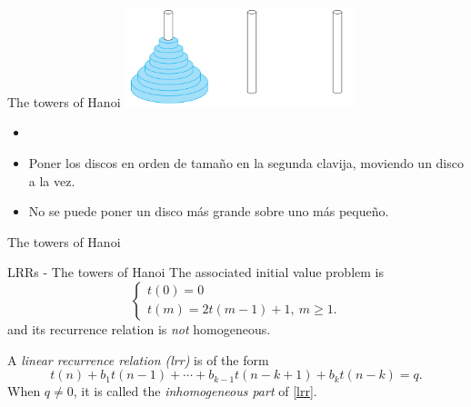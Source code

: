 \documentclass{beamer}
\begin{document}
\begin{frame}{The towers of Hanoi}
	\includegraphics[width=0.5\textwidth]{hanoi.png}

	\begin{itemize}
		\item[]
		\item Poner los discos en orden de tamaño en la segunda clavija,
			moviendo un disco a la vez.
		\item No se puede poner un disco más grande sobre uno más pequeño.
	\end{itemize}
\end{frame}

%

\begin{frame}{The towers of Hanoi}
	
\end{frame}

%

\begin{frame}{LRRs - The towers of Hanoi}
	The associated initial value problem is
	\begin{displaymath}
		\begin{cases}
			t(0)= 0\\
			t(m)= 2t(m-1) + 1,\ m \geq 1.
		\end{cases}
	\end{displaymath}
	and its recurrence relation is \emph{not} homogeneous.\pause
	\begin{defn}
		A \emph{linear recurrence relation (lrr)} is of the form
		\begin{equation}\label{lrr}
			t(n) + b_1t(n-1) + \cdots + b_{k-1}t(n-k+1) + b_kt(n-k)= q.
		\end{equation}\pause
		When $q \neq 0$, it is called the \emph{inhomogeneous part} of \eqref{lrr}.
	\end{defn}
\end{frame}

%
\end{document}
